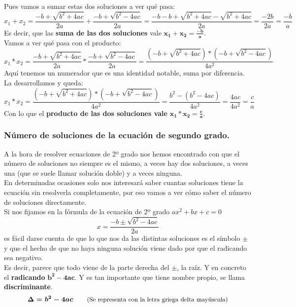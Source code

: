 \documentclass[a4paper,11pt,answers]{exam}
\begin{document}
Pues vamos a sumar estas dos soluciones a ver qué pasa:
\[x_1 + x_2 = \frac{-b+\sqrt{b^2 + 4ac}}{2a} + \frac{-b+\sqrt{b^2 - 4ac}}{2a}
  = \frac{-b - b + \sqrt{b^2 + 4ac} - \sqrt{b^2 + 4ac}}{2a} = \frac{-2b}{2a}= \frac{-b}{a}\]
Es decir, que las \textbf{suma de las dos soluciones} vale $\boldsymbol{x_1 + x_2 = \frac{-b}{a}}$.\\

Vamos a ver qué pasa con el producto:
\[x_1 * x_2 = \frac{-b+\sqrt{b^2 + 4ac}}{2a} * \frac{-b+\sqrt{b^2 - 4ac}}{2a} =
  \frac{\left(-b+\sqrt{b^2 + 4ac}\right) * \left(-b+\sqrt{b^2 - 4ac}\right)}{4a^2}\]
Aquí tenemos un numerador que es una identidad notable, suma por diferencia. La desarrollamos y queda:
\[x_1 * x_2 = \frac{\left(-b+\sqrt{b^2 + 4ac}\right) * \left(-b+\sqrt{b^2 - 4ac}\right)}{4a^2}
  =\frac{b^2 - (b^2 - 4ac)}{4a^2} = \frac{4ac}{4a^2} = \frac{c}{a}\]
Con lo que el \textbf{producto de las dos soluciones vale }$\boldsymbol{x_1 * x_2 = \frac{c}{a}}$.

\subsubsection{Número de soluciones de la ecuación de segundo grado.} \label{discriminante}
A la hora de resolver ecuaciones de 2º grado nos hemos encontrado con que el número de soluciones
no siempre es el mismo, a veces hay dos soluciones, a veces una (que se suele llamar solución doble) y a veces ninguna.\\

En determinadas ocasiones solo nos interesará saber cuantas soluciones tiene la ecuación sin
resolverla completamente, por eso vamos a ver cómo saber el número de soluciones directamente.\\

Si nos fijamos en la fórmula de la ecuación de 2º grado $ax^2 + bx +c = 0$
\[x = \frac{-b \pm \sqrt{b^2 - 4ac}}{2a}\]
es fácil darse cuenta de que lo que nos da las distintas soluciones es el símbolo
$\boldsymbol{\pm}$ y que el hecho de que no haya ninguna solución viene dado por que el radicando
sea negativo.\\
Es decir, parece que todo viene de la parte derecha del $\pm$, la raíz. Y en concreto el
\textbf{radicando} $\boldsymbol{b^2 - 4ac}$. Y es tan importante que tiene nombre propio, se llama
\textbf{discriminante}.
\[\boldsymbol{\Delta = b^2 - 4ac}\quad\quad\text{\small{(Se representa con la letra griega delta
      mayúscula)}}\]
\end{document}
